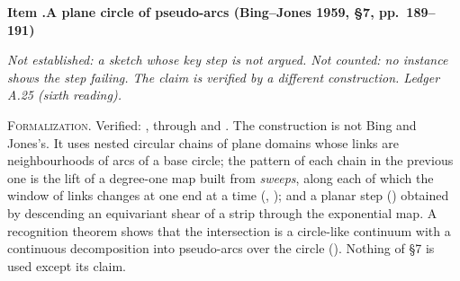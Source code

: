 \documentclass[11pt]{article}
\newcounter{defect}
\newenvironment{defect}[4]{%
  \par\addvspace{10pt}\refstepcounter{defect}%
  \noindent\textbf{Item \thedefect.\enspace #1}\par\nopagebreak
  \noindent\textit{#2}\par\nopagebreak\smallskip}{\par\addvspace{6pt}}
\newcommand{\fld}[1]{\par\noindent\textsc{#1.}\enspace}
\begin{document}
\begin{defect}{A plane circle of pseudo-arcs (Bing--Jones 1959, \S7, pp.~189--191)}{Not
established: a sketch whose key step is not argued. Not counted: no instance shows the step
failing. The claim is verified by a different construction. Ledger A.25 (sixth reading).}{0}{0}
\fld{Formalization} Verified: , through  and
. The construction is not Bing and Jones's. It uses nested circular
chains of plane domains whose links are neighbourhoods of arcs of a base circle; the pattern of
each chain in the previous one is the lift of a degree-one map built from \emph{sweeps}, along each
of which the window of links changes at one end at a time (,
); and a planar step () obtained by descending an equivariant
shear of a strip through the exponential map. A recognition theorem shows that the intersection is
a circle-like continuum with a continuous decomposition into pseudo-arcs over the circle
(). Nothing of \S7 is used except its claim.
\end{defect}
\end{document}
